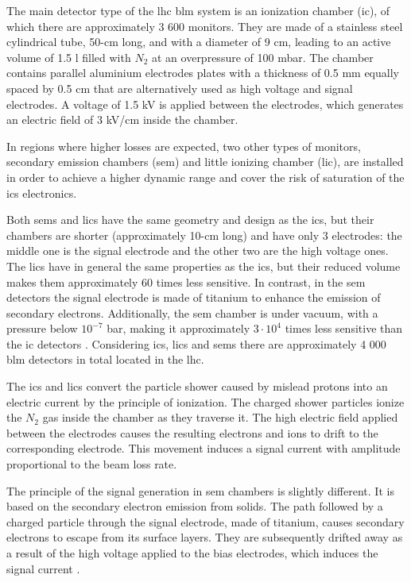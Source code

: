 \documentclass[encoding=utf8,british]{tumphthesis}
\begin{document}
The main detector type of the \acrshort{lhc} \acrshort{blm} system is an ionization chamber (\acrshort{ic}), of which there are approximately 3 600 monitors. They are made of a stainless steel cylindrical tube, 50-cm long, and with a diameter of 9 cm, leading to an active volume of 1.5 l filled with $N_2$ at an overpressure of 100 mbar. The chamber contains parallel aluminium electrodes plates with a thickness of 0.5 mm equally spaced by 0.5 cm that are alternatively used as high voltage and signal electrodes. A voltage of 1.5 kV is applied between the electrodes, which generates an electric field of 3 kV/cm inside the chamber.

In regions where higher losses are expected, two other types of monitors, secondary emission chambers (\acrshort{sem}) and little ionizing chamber (\acrshort{lic}), are installed in order to achieve a higher dynamic range and cover the risk of saturation of
the \acrshort{ic}s electronics.

Both \acrshort{sem}s and \acrshort{lic}s have the same geometry and design as the \acrshort{ic}s, but their chambers are shorter (approximately 10-cm long) and have only 3 electrodes: the middle one is the signal electrode and the other two are the high voltage ones. The \acrshort{lic}s have in general the same properties as the \acrshort{ic}s, but their reduced volume makes them approximately 60 times less sensitive. In contrast, in the \acrshort{sem} detectors the signal electrode is made of titanium to enhance the emission of secondary electrons. Additionally, the \acrshort{sem} chamber is under vacuum, with a pressure below $10^{-7}$ bar, making it approximately $3\cdot10^4$ times less sensitive than the \acrshort{ic} detectors \cite{Grishin:RUPAC2018-TUZMH03}. Considering \acrshort{ic}s, \acrshort{lic}s and \acrshort{sem}s there are approximately 4 000 \acrshort{blm} detectors in total located in the \acrshort{lhc}.

The \acrshort{ic}s and \acrshort{lic}s convert the particle shower caused by mislead protons into an electric current by the principle of ionization. The charged shower particles ionize the $N_2$ gas inside the chamber as they traverse it. The high electric field applied between the electrodes causes the resulting electrons and ions to drift to the corresponding electrode. This movement induces a signal current with amplitude proportional to the beam loss rate.

The principle of the signal generation in \acrshort{sem} chambers is slightly different. It is based on the secondary electron emission from solids. The path followed by a charged particle through the signal electrode, made of titanium, causes secondary electrons to escape from its surface layers. They are subsequently drifted away as a result of the high voltage applied to the bias electrodes, which induces the signal current \cite{KRAMER2007246}.
\end{document}

